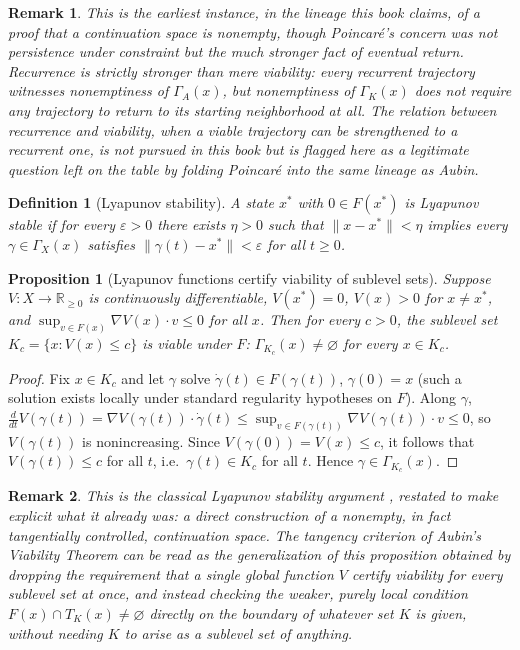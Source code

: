 \documentclass[11pt]{report}
\newtheorem{proposition}{Proposition}[chapter]
\newtheorem{definition}{Definition}[chapter]
\newtheorem{remark}{Remark}[chapter]
\begin{document}
\begin{remark}
This is the earliest instance, in the lineage this book claims, of a
proof that a continuation space is nonempty, though Poincar\'e's
concern was not persistence under constraint but the much stronger fact
of eventual return. Recurrence is strictly stronger than mere viability:
every recurrent trajectory witnesses nonemptiness of $\Gamma_A(x)$, but
nonemptiness of $\Gamma_K(x)$ does not require any trajectory to return
to its starting neighborhood at all. The relation between recurrence and
viability, when a viable trajectory can be strengthened to a recurrent
one, is not pursued in this book but is flagged here as a legitimate
question left on the table by folding Poincar\'e into the same lineage
as Aubin.
\end{remark}

\begin{definition}[Lyapunov stability]
A state $x^\ast$ with $0 \in F(x^\ast)$ is Lyapunov stable if for every
$\varepsilon > 0$ there exists $\eta > 0$ such that
$\|x - x^\ast\| < \eta$ implies every $\gamma \in \Gamma_X(x)$ satisfies
$\|\gamma(t) - x^\ast\| < \varepsilon$ for all $t \geq 0$.
\end{definition}

\begin{proposition}[Lyapunov functions certify viability of sublevel sets]
Suppose $V : X \to \mathbb{R}_{\geq 0}$ is continuously differentiable,
$V(x^\ast) = 0$, $V(x) > 0$ for $x \neq x^\ast$, and
$\sup_{v \in F(x)} \nabla V(x) \cdot v \leq 0$ for all $x$. Then for
every $c > 0$, the sublevel set $K_c = \{x : V(x) \leq c\}$ is viable
under $F$: $\Gamma_{K_c}(x) \neq \varnothing$ for every $x \in K_c$.
\end{proposition}
\begin{proof}
Fix $x \in K_c$ and let $\gamma$ solve $\dot\gamma(t) \in F(\gamma(t))$,
$\gamma(0) = x$ (such a solution exists locally under standard
regularity hypotheses on $F$). Along $\gamma$,
$\frac{d}{dt} V(\gamma(t)) = \nabla V(\gamma(t)) \cdot \dot\gamma(t) \leq
\sup_{v \in F(\gamma(t))} \nabla V(\gamma(t)) \cdot v \leq 0$, so
$V(\gamma(t))$ is nonincreasing. Since $V(\gamma(0)) = V(x) \leq c$, it
follows that $V(\gamma(t)) \leq c$ for all $t$, i.e.\ $\gamma(t) \in K_c$
for all $t$. Hence $\gamma \in \Gamma_{K_c}(x)$.
\end{proof}

\begin{remark}
This is the classical Lyapunov stability argument \cite{lyapunov1892},
restated to make explicit what it already was: a direct construction of
a nonempty, in fact tangentially controlled, continuation space. The
tangency criterion of Aubin's Viability Theorem can be read as the
generalization of this proposition obtained by dropping the requirement
that a single global function $V$ certify viability for every sublevel
set at once, and instead checking the weaker, purely local condition
$F(x) \cap T_K(x) \neq \varnothing$ directly on the boundary of whatever
set $K$ is given, without needing $K$ to arise as a sublevel set of
anything.
\end{remark}
\end{document}
